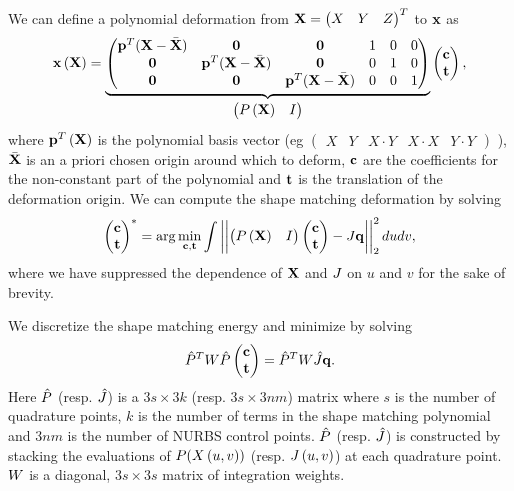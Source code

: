 We can define a polynomial deformation from $\mathbf{X} = \begin{pmatrix} X & Y & Z \end{pmatrix}^T$ to $\mathbf{x}$  as 
\begin{equation}
    \mathbf{x}\left(\mathbf{X}\right) = 
    \underbrace{\begin{pmatrix}
    \mathbf{p}^T(\mathbf{X}-\bar{\mathbf{X}}) & \mathbf{0} & \mathbf{0} & 1 & 0 & 0\\
    \mathbf{0} & \mathbf{p}^T(\mathbf{X}-\bar{\mathbf{X}}) & \mathbf{0} & 0 & 1 & 0\\
    \mathbf{0} & \mathbf{0} & \mathbf{p}^T(\mathbf{X}-\bar{\mathbf{X}}) & 0 & 0 & 1\\
    \end{pmatrix}}_{\begin{pmatrix}P\left(\mathbf{X}\right) & I \end{pmatrix}}
    \begin{pmatrix} \mathbf{c}\\ \mathbf{t} \end{pmatrix},
\end{equation} where $\mathbf{p}^T\left(\mathbf{X}\right)$ is the polynomial basis vector \newline (eg $\begin{pmatrix} X & Y & X\cdot Y & X\cdot X & Y\cdot Y \end{pmatrix}$ ),
$\bar{\mathbf{X}}$ is an a priori chosen origin around which to deform, $\mathbf{c}$ are the coefficients for the 
non-constant part of the polynomial and $\mathbf{t}$ is the translation of the deformation origin. 
We can compute the shape matching deformation by solving
\begin{equation}
   \begin{pmatrix} \mathbf{c}\\ \mathbf{t} \end{pmatrix}^* = \arg\min_{\mathbf{c},\mathbf{t}} \int \left\lvert\left\lvert\begin{pmatrix}P\left(\mathbf{X}\right) & I \end{pmatrix}\begin{pmatrix} \mathbf{c}\\ \mathbf{t} \end{pmatrix} - J\mathbf{q}\right\rvert\right\rvert^2_2 dudv,
\end{equation} where we have suppressed the dependence of $\mathbf{X}$ and $J$ on $u$ and $v$ for the sake of brevity.

We discretize the shape matching energy and minimize by solving
\begin{equation}
\hat{P}^TW\hat{P}\begin{pmatrix} \mathbf{c}\\ \mathbf{t} \end{pmatrix} = \hat{P}^TW\hat{J}\mathbf{q}.
\end{equation} Here $\hat{P}$ (resp. $\hat{J}$) is a $3s \times 3k$ (resp. $3s \times 3nm$) matrix where $s$ is the number of quadrature points, 
$k$ is the number of  terms in the shape matching polynomial and $3nm$ is the number of NURBS control points. 
$\hat{P}$ (resp. $\hat{J}$) is constructed by stacking the evaluations of $P(X\left(u, v\right))$ (resp. $J\left(u, v\right)$) at each
quadrature point.
$W$ is a diagonal, $3s \times 3s$ matrix of integration weights.







